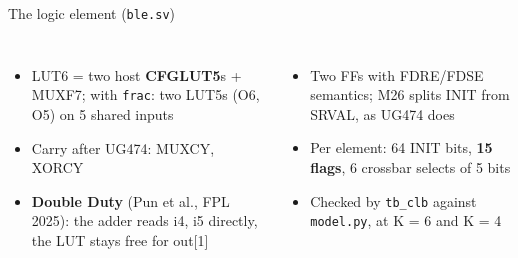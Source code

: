 \documentclass[aspectratio=169,11pt]{beamer}
\begin{document}
\begin{frame}{The logic element (\texttt{ble.sv})}
  \scriptsize
  \begin{columns}[T]
    \begin{itemize}
      \item LUT6 = two host \textbf{CFGLUT5}s + MUXF7; with \texttt{frac}: two LUT5s (O6, O5) on 5 shared inputs
      \item Carry after UG474: MUXCY, XORCY
      \item \textbf{Double Duty} (Pun et al., FPL 2025): the adder reads i4, i5 directly, the LUT stays free for out[1]
    \end{itemize}
    \begin{itemize}
      \item Two FFs with FDRE/FDSE semantics; M26 splits INIT from SRVAL, as UG474 does
      \item Per element: 64 INIT bits, \textbf{15 flags}, 6 crossbar selects of 5 bits
      \item Checked by \texttt{tb\_clb} against \texttt{model.py}, at K = 6 and K = 4
    \end{itemize}
  \end{columns}
\end{frame}
\end{document}

